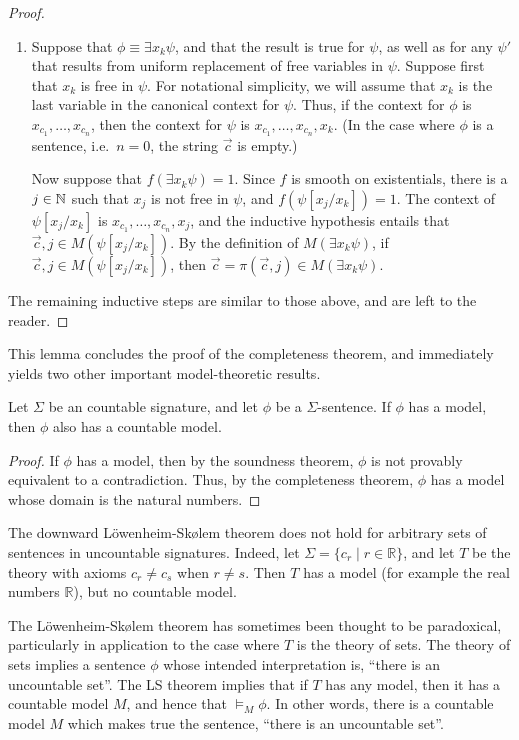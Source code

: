 \begin{proof}
\begin{enumerate}
    
    
  \item Suppose that $\phi\equiv \exists x_k\psi$, and that the result
    is true for $\psi$, as well as for any $\psi '$ that results from
    uniform replacement of free variables in $\psi$.  Suppose first
    that $x_k$ is free in $\psi$.  For notational simplicity, we will
    assume that $x_k$ is the last variable in the canonical context
    for $\psi$.  Thus, if the context for $\phi$ is
    $x_{c_1},\dots ,x_{c_n}$, then the context for $\psi$ is
    $x_{c_1},\dots ,x_{c_n},x_k$.  (In the case where $\phi$ is a
    sentence, i.e.\ $n=0$, the string $\vec{c}$ is empty.)

    Now suppose that $f(\exists x_k\psi )=1$.  Since $f$ is smooth on
    existentials, there is a $j\in\mathbb N$ such that $x_j$ is not free in
    $\psi$, and $f(\psi [x_j/x_k])=1$.  The context of
    $\psi [x_j/x_k]$ is $x_{c_1},\dots ,x_{c_n},x_j$, and the
    inductive hypothesis entails that
    $\vec{c},j\in M(\psi [x_j/x_k])$.  By the definition of
    $M(\exists x_k\psi )$, if $\vec{c},j\in M(\psi [x_j/x_k])$, then
    $\vec{c}=\pi (\vec{c},j)\in M(\exists x_k\psi )$.
  \end{enumerate}
  The remaining inductive steps are similar to those above, and are
  left to the reader.  \end{proof}

This lemma concludes the proof of the completeness theorem, and
immediately yields two other important model-theoretic results.

\begin{thm} Let $\Sigma$ be an
  countable signature, and let $\phi$ be a $\Sigma$-sentence.  If
  $\phi$ has a model, then $\phi$ also has a countable model.
\end{thm}

\begin{proof} If $\phi$ has a model, then by the soundness theorem,
  $\phi$ is not provably equivalent to a contradiction.  Thus, by the
  completeness theorem, $\phi$ has a model whose domain is the natural
  numbers. \end{proof}

\begin{disc} The downward L{\"o}wenheim-Sk{\o}lem theorem does not
  hold for arbitrary sets of sentences in uncountable signatures.
  Indeed, let $\Sigma = \{ c_r\mid r\in \mathbb{R} \}$, and let $T$ be
  the theory with axioms $c_r\neq c_s$ when $r\neq s$.  Then $T$ has a
  model (for example the real numbers $\mathbb{R}$), but no countable
  model.

  The L{\"o}wenheim-Sk{\o}lem theorem has sometimes been thought to be
  paradoxical, particularly in application to the case where $T$ is
  the theory of sets.  The theory of sets implies a sentence $\phi$
  whose intended interpretation is, ``there is an uncountable set''.
  The LS theorem implies that if $T$ has any model, then it has a
  countable model $M$, and hence that $\vDash _M\phi$.  In other
  words, there is a countable model $M$ which makes true the sentence,
  ``there is an uncountable set''.  \end{disc}

